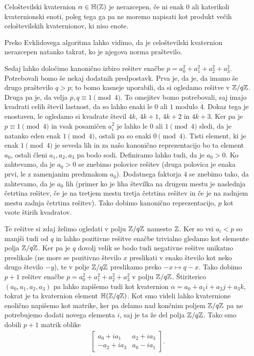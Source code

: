 \begin{definicija}
    Celoštevilski kvaternion \(\alpha\in \mathbb H(\mathbb Z)\) je nerazcepen, če ni enak \(0\) ali katerikoli kvaternionski enoti, poleg tega ga pa ne moremo napisati kot produkt večih celoštevilskih kvaternionov, ki niso enote.
\end{definicija}
Preko Evklidovega algoritma lahko vidimo, da je celoštevilski kvaternion nerazcepen natanko takrat, ko je njegova norma praštevilo.

Sedaj lahko določimo kanonično izbiro rešitev enačbe \(p=a_0^2 + a_1^2 + a_2^2 + a_3^2\). Potrebovali bomo še nekaj dodatnih predpostavk. Prva je, da je, da imamo še drugo praštevilo \(q>p\); to bomo kasneje uporabili, da si ogledamo rešitve v \(\mathbb Z/q\mathbb Z\). Druga pa je, da velja \(p,q \equiv 1 \pmod 4\). To omejitev bomo potrebovali, saj imajo kvadrati celih števil lastnost, da so lahko enaki le \(0\) ali \(1\) modulo 4. Dokaz tega je enostaven, le ogledamo si kvadrate števil \(4k\), \(4k+1\), \(4k+2\) in \(4k+3\). Ker pa je \(p\equiv 1 \pmod 4\) in vsak posamičen \(a_i^2\) je lahko le \(0\) ali \(1\pmod 4\) sledi, da je natanko eden enak \(1\pmod4\), ostali pa so enaki \(0\pmod 4\). Tisti element, ki je enak \(1\pmod4\) je seveda lih in za našo kanonično reprezentacijo bo ta element \(a_0\), ostali členi \(a_1, a_2, a_3\) pa bodo sodi. Definiramo lahko tudi, da je \(a_0>0\). Ko zahtevamo, da je \(a_0>0\) se znebimo polovice rešitev (druga polovica je enaka prvi, le z zamenjanim predznakom \(a_0\)). Dodatnega faktorja \(4\) se znebimo tako, da zahtevamo, da je \(a_0\) lih (primer ko je liha številka na drugem mestu je naslednja četrtina rešitev, če je na tretjem mestu tretja četrtina rešitev in če je na zadnjem mestu zadnja četrtina rešitev). Tako dobimo kanonično reprezentacijo, \(p\) kot vsote štirih kvadratov.

Te rešitve si zdaj želimo ogledati v polju \(\mathbb Z/q\mathbb Z\) namesto \(\mathbb Z\). Ker so vsi \(a_i<p\) so manjši tudi od \(q\) in lahko pozitivne rešitve enačbe trivialno gledamo kot elemente polja \(\mathbb Z/q\mathbb Z\). Ker pa je \(q\) dovolj velik se bodo tudi negativne rešitve unikatno preslikale (ne more se pozitivno število \(x\) preslikati v enako število kot neko drugo število \(-y\)), te v polje \(\mathbb Z/q\mathbb Z\) preslikamo preko \(-x\mapsto q-x\). Tako dobimo \(p+1\) rešitev enačbe \(p=a_0^2 + a_1^2 + a_2^2 + a_3^2\) v polju \(\mathbb Z/q\mathbb Z\). Štiriterico \((a_0, a_1, a_2, a_3)\) pa lahko zapišemo tudi kot kvaternion \(\alpha = a_0 + a_1i + a_2j + a_3k\), tokrat je ta kvaternion element \(\mathbb H(\mathbb Z/q\mathbb Z)\). Kot smo videli lahko kvaternione enolično napišemo kot matrike, ker pa delamo nad končnim poljem \(\mathbb Z/q\mathbb Z\) pa ne potrebujemo dodati novega elementa \(i\), saj je ta že del polja \(\mathbb Z/q\mathbb Z\). Tako smo dobili \(p+1\) matrik oblike
\begin{align*}
    \begin{bmatrix}
        a_0 +ia_1 & a_2+ia_3 \\
        -a_2+ia_3 & a_0-ia_1
    \end{bmatrix}.
\end{align*}

